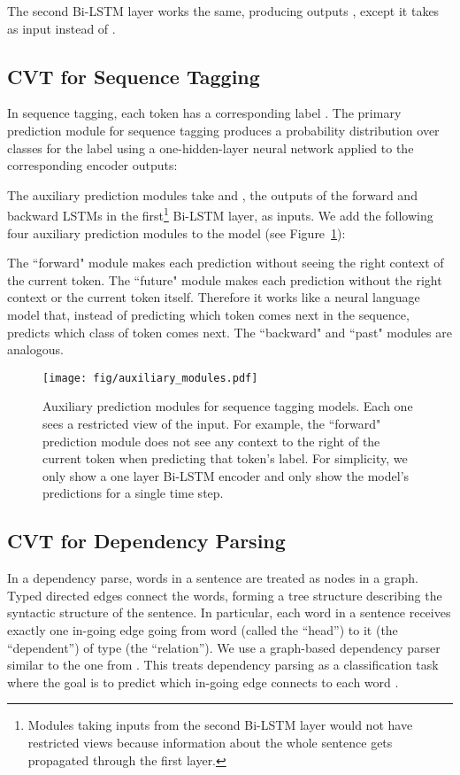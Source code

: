 \documentclass[11pt,a4paper]{article}
\newcommand{\alns}[1] {
	
}
\newcommand{\relu} {\text{ReLU}}
\newcommand{\mlp}{ \texttt{NN}}
\begin{document}
The second Bi-LSTM layer works the same, producing outputs , except it takes  as input instead of .


\subsection{CVT for Sequence Tagging}
\label{sec:tag}
In sequence tagging, each token  has a corresponding label . 
The primary prediction module for sequence tagging produces a probability distribution over classes for the  label using a one-hidden-layer neural network applied to the corresponding encoder outputs:
\alns{
   p(y^t|x_i) &= \mlp(h_1^t \oplus h_2^t) \\
   &= \text{softmax}(U\cdot \relu(W (h_1^t \oplus h_2^t)) + b)
}

The auxiliary prediction modules take  and , the outputs of the forward and backward LSTMs in the first\footnote{Modules taking inputs from the second Bi-LSTM layer would not have restricted views because information about the whole sentence gets propagated through the first layer.} Bi-LSTM layer, as inputs.
We add the following four auxiliary prediction modules to the model (see Figure~\ref{fig:seq}):

The ``forward" module makes each prediction without seeing the right context of the current token. 
The ``future" module makes each prediction without the right context or the current token itself.
Therefore it works like a neural language model that, instead of predicting which token comes next in the sequence, predicts which class of token comes next. The ``backward" and ``past" modules are analogous.  



\begin{figure}[t]
\texttt{[image: fig/auxiliary\_modules.pdf]}
\caption{Auxiliary prediction modules for sequence tagging models. Each one sees a restricted view of the input. For example, the ``forward" prediction module does not see any context to the right of the current token when predicting that token's label. For simplicity, we only show a one layer Bi-LSTM encoder and only show the model's predictions for a single time step.}
\label{fig:seq}
\end{figure}

\subsection{CVT for Dependency Parsing}
\label{sec:dep}
In a dependency parse, words in a sentence are treated as nodes in a graph. 
Typed directed edges connect the words, forming a tree structure describing the syntactic structure of the sentence. 
In particular, each word  in a sentence  receives exactly one in-going edge  going from word  (called the ``head'') to it (the ``dependent'') of type  (the ``relation''). 
We use a graph-based dependency parser similar to the one from \citet{Dozat2017Deep}. 
This treats dependency parsing as a classification task where the goal is to predict which in-going edge  connects to each word .
\end{document}
